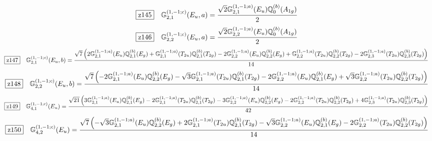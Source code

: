 \documentclass[fleqn,10pt,landscape]{jsarticle}
\begin{document}
\begin{dmath*}
\hspace*{3mm}\fbox{z145}\quad \mathbb{G}_{2,1}^{(1,-1;c)}(E_{u},a)=\frac{\sqrt{2} \mathbb{G}_{2,1}^{(1,-1;a)}(E_{u}) \mathbb{Q}_{0}^{(b)}(A_{1g})}{2}
\end{dmath*}
\begin{dmath*}
\hspace*{3mm}\fbox{z146}\quad \mathbb{G}_{2,2}^{(1,-1;c)}(E_{u},a)=\frac{\sqrt{2} \mathbb{G}_{2,2}^{(1,-1;a)}(E_{u}) \mathbb{Q}_{0}^{(b)}(A_{1g})}{2}
\end{dmath*}
\begin{dmath*}
\hspace*{3mm}\fbox{z147}\quad \mathbb{G}_{2,1}^{(1,-1;c)}(E_{u},b)=\frac{\sqrt{7} \left(2 \mathbb{G}_{2,1}^{(1,-1;a)}(E_{u}) \mathbb{Q}_{2,1}^{(b)}(E_{g}) + \mathbb{G}_{2,1}^{(1,-1;a)}(T_{2u}) \mathbb{Q}_{2,1}^{(b)}(T_{2g}) - 2 \mathbb{G}_{2,2}^{(1,-1;a)}(E_{u}) \mathbb{Q}_{2,2}^{(b)}(E_{g}) + \mathbb{G}_{2,2}^{(1,-1;a)}(T_{2u}) \mathbb{Q}_{2,2}^{(b)}(T_{2g}) - 2 \mathbb{G}_{2,3}^{(1,-1;a)}(T_{2u}) \mathbb{Q}_{2,3}^{(b)}(T_{2g})\right)}{14}
\end{dmath*}
\begin{dmath*}
\hspace*{3mm}\fbox{z148}\quad \mathbb{G}_{2,2}^{(1,-1;c)}(E_{u},b)=\frac{\sqrt{7} \left(- 2 \mathbb{G}_{2,1}^{(1,-1;a)}(E_{u}) \mathbb{Q}_{2,2}^{(b)}(E_{g}) - \sqrt{3} \mathbb{G}_{2,1}^{(1,-1;a)}(T_{2u}) \mathbb{Q}_{2,1}^{(b)}(T_{2g}) - 2 \mathbb{G}_{2,2}^{(1,-1;a)}(E_{u}) \mathbb{Q}_{2,1}^{(b)}(E_{g}) + \sqrt{3} \mathbb{G}_{2,2}^{(1,-1;a)}(T_{2u}) \mathbb{Q}_{2,2}^{(b)}(T_{2g})\right)}{14}
\end{dmath*}
\begin{dmath*}
\hspace*{3mm}\fbox{z149}\quad \mathbb{G}_{4,1}^{(1,-1;c)}(E_{u})=\frac{\sqrt{21} \left(3 \mathbb{G}_{2,1}^{(1,-1;a)}(E_{u}) \mathbb{Q}_{2,1}^{(b)}(E_{g}) - 2 \mathbb{G}_{2,1}^{(1,-1;a)}(T_{2u}) \mathbb{Q}_{2,1}^{(b)}(T_{2g}) - 3 \mathbb{G}_{2,2}^{(1,-1;a)}(E_{u}) \mathbb{Q}_{2,2}^{(b)}(E_{g}) - 2 \mathbb{G}_{2,2}^{(1,-1;a)}(T_{2u}) \mathbb{Q}_{2,2}^{(b)}(T_{2g}) + 4 \mathbb{G}_{2,3}^{(1,-1;a)}(T_{2u}) \mathbb{Q}_{2,3}^{(b)}(T_{2g})\right)}{42}
\end{dmath*}
\begin{dmath*}
\hspace*{3mm}\fbox{z150}\quad \mathbb{G}_{4,2}^{(1,-1;c)}(E_{u})=\frac{\sqrt{7} \left(- \sqrt{3} \mathbb{G}_{2,1}^{(1,-1;a)}(E_{u}) \mathbb{Q}_{2,2}^{(b)}(E_{g}) + 2 \mathbb{G}_{2,1}^{(1,-1;a)}(T_{2u}) \mathbb{Q}_{2,1}^{(b)}(T_{2g}) - \sqrt{3} \mathbb{G}_{2,2}^{(1,-1;a)}(E_{u}) \mathbb{Q}_{2,1}^{(b)}(E_{g}) - 2 \mathbb{G}_{2,2}^{(1,-1;a)}(T_{2u}) \mathbb{Q}_{2,2}^{(b)}(T_{2g})\right)}{14}
\end{dmath*}
\end{document}
